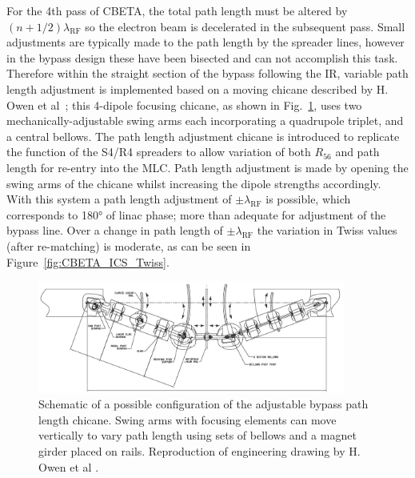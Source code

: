 \documentclass[../main.tex]{subfiles}
\begin{document}
For the 4th pass of CBETA, the total path length must be altered by $(n+1/2)\lambda_{\mathrm{RF}}$ so the electron beam is decelerated in the subsequent pass. Small adjustments are typically made to the path length by the spreader lines, however in the bypass design these have been bisected and can not accomplish this task. Therefore within the straight section of the bypass following the IR, variable path length adjustment is implemented based on a moving chicane described by H. Owen et al~\cite{owen2012modular}; this 4-dipole focusing chicane, as shown in Fig.~\ref{fig:bypass_chicane_drawing}, uses two mechanically-adjustable swing arms each incorporating a quadrupole triplet, and a central bellows. The path length adjustment chicane is introduced to replicate the function of the S4/R4 spreaders to allow variation of both $R_{56}$ and path length for re-entry into the MLC. Path length adjustment is made by opening the swing arms of the chicane whilst increasing the dipole strengths accordingly. With this system a path length adjustment of $\pm\lambda_{\mathrm{RF}}$ is possible, which corresponds to 180\si{\degree} of linac phase; more than adequate for adjustment of the bypass line. Over a change in path length of $\pm\lambda_{\mathrm{RF}}$ the variation in Twiss values (after re-matching) is moderate, as can be seen in Figure~\ref{fig:CBETA_ICS_Twiss}.
\begin{figure}[!h]
\centering
\includegraphics[width=0.9\textwidth]{Figures/CBETA_Inverse_Compton_Source_Design/CBETA_bypass_adjustment_chicane.pdf}
\caption{Schematic of a possible configuration of the adjustable bypass path length chicane. Swing arms with focusing elements can move vertically to vary path length using sets of bellows and a magnet girder placed on rails. Reproduction of engineering drawing by H. Owen et al \cite{owen2012modular}.}
\label{fig:bypass_chicane_drawing}
\end{figure}
\end{document}
